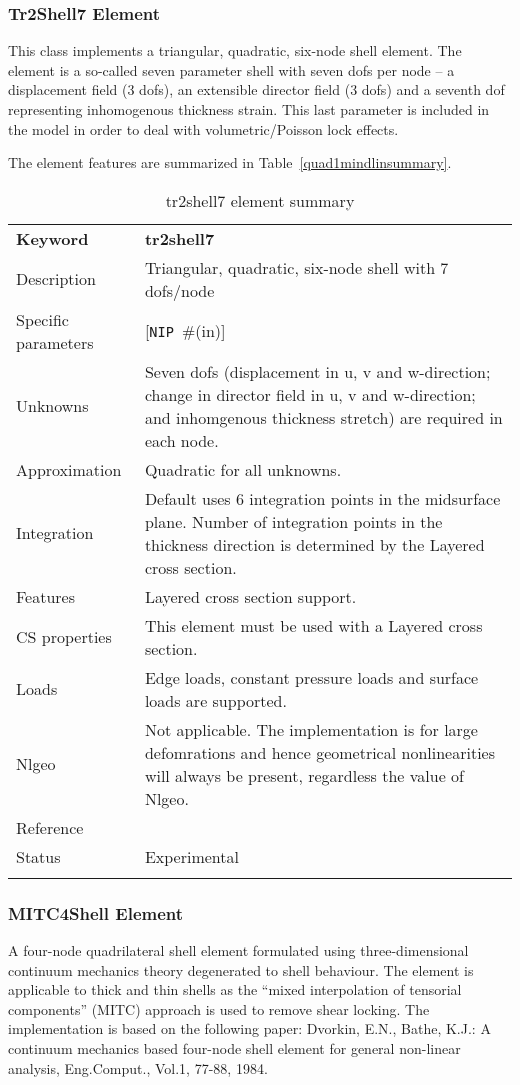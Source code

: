 \documentclass[a4paper]{article}
\newcommand{\param}[1]{\texttt{#1}} %
\newcommand{\optional}[1]{[#1]} %
\newcommand{\field}[2]{\param{#1}~\#{\tiny(#2)}} %
\newcommand{\optField}[2]{\optional{\field{#1}{#2}}}
\newcommand{\templabel}{}%
\newcommand{\tempcaption}{}%
\newcounter{nelpar}
\newenvironment{elementsummary}[5]{%
  \gdef\tempcaption{#4}%
  \gdef\templabel{#5}%
  \setcounter{nelpar}{0}%
  \begin{center} %
    \begin{table}[!htb] %
      \begin{tabular}{|l|p{9cm}|}\hline %
        {\bf Keyword} & \bf{#1}\\ %
        {Description} & {#2}\\ %
        {Specific parameters} & {#3}\\ \hline %
}{
  \\ \hline %
      \end{tabular}%
      \caption{\tempcaption}%
      \label{\templabel}%
    \end{table}%
  \end{center}%
}
\newcommand{\elementDescription}[2]{{#1} & {#2}\\ }
\begin{document}
\subsubsection{Tr2Shell7 Element} \label{tr2shell7}
This class implements a triangular, quadratic, six-node shell element. The element is a so-called seven parameter shell with seven dofs per node -- a displacement field (3 dofs), an extensible director field (3 dofs) and a seventh dof representing inhomogenous thickness strain. This last parameter is included in the model in order to deal with volumetric/Poisson lock effects.

The element features are summarized in Table~\ref{quad1mindlinsummary}.

\begin{elementsummary}{tr2shell7}{Triangular, quadratic, six-node shell with 7 dofs/node}{\optField{NIP}{in}}{tr2shell7 element summary}{tr2shell7summary}

\elementDescription{Unknowns}{Seven dofs (displacement in u, v and w-direction; change in director field in u, v and w-direction; and inhomgenous thickness stretch) are required in each node.}
\elementDescription{Approximation}{Quadratic for all unknowns.}
\elementDescription{Integration}{Default uses 6 integration points in the midsurface plane. Number of integration points in the thickness direction is determined by the Layered cross section.}
\elementDescription{Features}{Layered cross section support.}
\elementDescription{CS properties}{This element must be used with a Layered cross section.}
\elementDescription{Loads}{Edge loads, constant pressure loads and surface loads are supported.}
\elementDescription{Nlgeo}{Not applicable. The implementation is for large defomrations and hence geometrical nonlinearities will always be present, regardless the value of Nlgeo.}
\elementDescription{Reference}{\cite{RagnarLarsson2011}}
\elementDescription{Status}{Experimental}
\end{elementsummary}



\subsubsection {MITC4Shell Element}
A four-node quadrilateral shell element formulated using three-dimensional continuum mechanics theory degenerated to shell behaviour. The element is applicable to thick and thin shells as the ``mixed interpolation of tensorial components'' (MITC) approach is used to remove shear locking. The implementation is based on the following paper: Dvorkin, E.N., Bathe, K.J.: A continuum mechanics based four-node shell element for general non-linear analysis, Eng.Comput., Vol.1, 77-88, 1984. 
\end{document}
